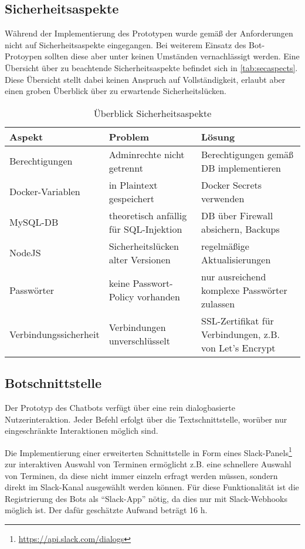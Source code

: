 \subsection{Sicherheitsaspekte}

Während der Implementierung des Prototypen wurde gemäß der Anforderungen nicht auf Sicherheitsaspekte eingegangen. Bei weiterem Einsatz des Bot-Protoypen sollten diese aber unter keinen Umständen vernachlässigt werden. Eine Übersicht über zu beachtende Sicherheitsaspekte befindet sich in \autoref{tab:secaspects}. Diese Übersicht stellt dabei keinen Anspruch auf Vollständigkeit, erlaubt aber einen groben Überblick über zu erwartende Sicherheitslücken.

\begin{table}[h]
    \centering
    \begin{tabularx}{\textwidth}{|X|X|X|}
        \hline
        \textbf{Aspekt} & \textbf{Problem} & \textbf{Lösung} \\
        \hline
        Berechtigungen & Adminrechte nicht getrennt & Berechtigungen gemäß DB implementieren \\
        \hline
        Docker-Variablen & in Plaintext gespeichert & Docker Secrets verwenden \\
        \hline
        MySQL-DB & theoretisch anfällig für SQL-Injektion & DB über Firewall absichern, Backups \\
        \hline
        NodeJS & Sicherheitslücken alter Versionen & regelmäßige Aktualisierungen \\
        \hline
        Passwörter & keine Passwort-Policy vorhanden & nur ausreichend komplexe Passwörter zulassen \\
        \hline
        Verbindungssicherheit & Verbindungen unverschlüsselt & SSL-Zertifikat für Verbindungen, z.B. von Let's Encrypt \\
        \hline
    \end{tabularx}
    \caption{Überblick Sicherheitsaspekte}
    \label{tab:secaspects}
\end{table}

\subsection{Botschnittstelle}
Der Prototyp des Chatbots verfügt über eine rein dialogbasierte Nutzerinteraktion. Jeder Befehl erfolgt über die Textschnittstelle, worüber nur eingeschränkte Interaktionen möglich sind.

Die Implementierung einer erweiterten Schnittstelle in Form eines Slack-Panels\footnote{\url{https://api.slack.com/dialogs}} zur interaktiven Auswahl von Terminen ermöglicht z.B. eine schnellere Auswahl von Terminen, da diese nicht immer einzeln erfragt werden müssen, sondern direkt im Slack-Kanal ausgewählt werden können.
Für diese Funktionalität ist die Registrierung des Bots als \enquote{Slack-App} nötig, da dies nur mit Slack-Webhooks möglich ist.
Der dafür geschätzte Aufwand beträgt 16 h.
